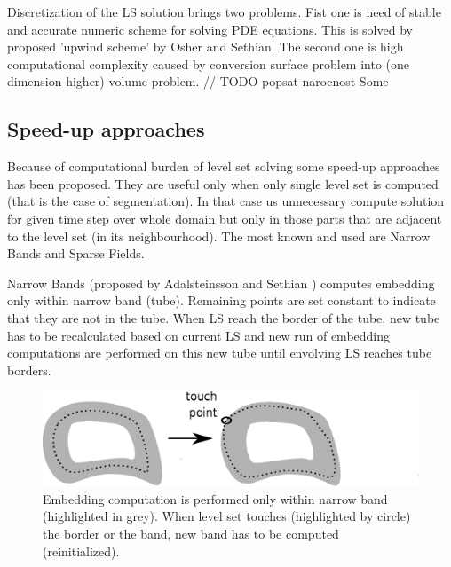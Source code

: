 Discretization of the LS solution brings two problems.
Fist one is need of stable and accurate numeric scheme for solving PDE equations.
This is solved by proposed 'upwind scheme' by Osher and Sethian\cite{sethianLS}.
The second one is high computational complexity caused by conversion surface problem into (one dimension higher) volume problem.
// TODO popsat narocnost
Some

\subsection{Speed-up approaches}

Because of computational burden of level set solving some speed-up approaches has been proposed.
They are useful only when only single level set is computed (that is the case of segmentation).
In that case us unnecessary compute solution for given time step over whole domain but only in those parts that are adjacent to the level set (in its neighbourhood).
The most known and used are Narrow Bands and Sparse Fields.

Narrow Bands (proposed by Adalsteinsson and Sethian \cite{sethianFastLS}) computes embedding only within narrow band (tube).
Remaining points are set constant to indicate that they are not in the tube.
When LS reach the border of the tube, new tube has to be recalculated based on current LS and new run of embedding computations are performed on this new tube until envolving LS reaches tube borders.

\begin{figure}
    \centering
    \includegraphics[width=\textwidth]{data/narrowBands}
    \caption[Narrow bands computation illustration]{Embedding computation is performed only within narrow band (highlighted in grey). When level set touches (highlighted by circle) the border or the band, new band has to be computed (reinitialized).}
    \label{fg:narrowBands}
\end{figure}

